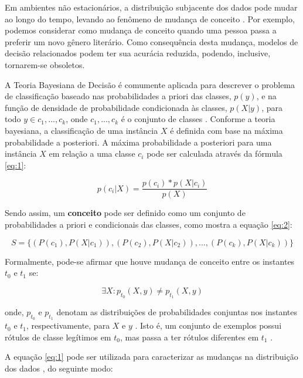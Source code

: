 \documentclass[qual, classic, a4paper]{ufbathesis}
\begin{document}
Em ambientes não estacionários, a distribuição subjacente dos dados pode mudar ao longo do tempo, levando ao fenômeno de mudança de conceito \cite{Schlimmer1986}.
Por exemplo, podemos considerar como mudança de conceito quando uma pessoa passa a preferir um novo gênero literário.
Como consequência desta mudança, modelos de decisão relacionados podem ter sua acurácia reduzida, podendo, inclusive, tornarem-se obsoletos.

A Teoria Bayesiana de Decisão \cite{Duda:2000:PC:954544} é comumente aplicada para descrever o problema de classificação baseado 
nas probabilidades a priori das classes, $p(y)$, e na função de densidade de probabilidade condicionada às classes, $p(X|y)$, para todo 
$y \in {c_1, ..., c_k}$, onde $c_1, ..., c_k$ é o conjunto de classes \cite{Zliobaite:2010, Gama:2014:SCD:2597757.2523813}.
Conforme a teoria bayesiana, a classificação de uma instância $X$ é definida com base na máxima probabilidade a posteriori.
A máxima probabilidade a posteriori para uma instância $X$ em relação a uma classe $c_i$ pode ser calculada através da fórmula \ref{eq:1}:

\begin{equation} \label{eq:1}
p(c_i|X) = \frac{p(c_i) * p(X|c_i)}{p(X)}
\end{equation}

Sendo assim, um \textbf{conceito} pode ser definido como um conjunto de probabilidades a priori e condicionais das classes, como mostra a equação \ref{eq:2}:

\begin{equation} \label{eq:2}
    S = \{(P(c_1), P(X|c_1)), (P(c_2), P(X|c_2)), ..., (P(c_k), P(X|c_k))\}
\end{equation}

Formalmente, pode-se afirmar que houve mudança de conceito entre os instantes $t_0$ e $t_1$ se:

\begin{equation} \label{eq:3}
    {\exists}X : p_{t_0}(X, y) \ne p_{t_1}(X, y)
\end{equation}

onde, $p_{t_0}$ e $p_{t_1}$ denotam as distribuições de probabilidades conjuntas nos instantes $t_0$ e $t_1$, respectivamente, 
para $X$ e $y$ \cite{Gama:2014:SCD:2597757.2523813}. 
Isto é, um conjunto de exemplos possui rótulos de classe legítimos em $t_0$, mas passa a ter rótulos diferentes em $t_1$ \cite{Kolter:2007:DWM:1314498.1390333}.

A equação \ref{eq:1} pode ser utilizada para caracterizar as mudanças na distribuição dos dados \cite{Gao:2007, Gama:2014:SCD:2597757.2523813}, do seguinte modo:
\end{document}

